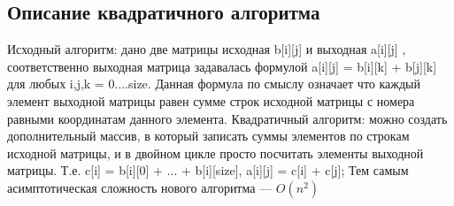 \documentclass[a4peper, 12pt, titlepage, finall]{extreport}
\begin{document}
        \subsection{Описание квадратичного алгоритма}
        Исходный алгоритм: дано две матрицы исходная {\ttfamily b[i][j]} и выходная {\ttfamily a[i][j]} , соответственно
        выходная матрица задавалась формулой {\ttfamily a[i][j] = b[i][k] + b[j][k]} для любых {\ttfamily i,j,k = 0....size.}
        Данная формула по смыслу означает что каждый элемент выходной матрицы равен сумме
        строк исходной матрицы с номера равными координатам данного элемента.
        Квадратичный алгоритм: можно создать дополнительный массив, в который записать суммы
        элементов по строкам исходной матрицы, и в двойном цикле просто посчитать элементы
        выходной матрицы. Т.е. {\ttfamily c[i] = b[i][0] + ... + b[i][size], a[i][j] = c[i] + c[j];} Тем самым
        асимптотическая сложность нового алгоритма — {\ttfamily $O(n^{2})$ }
\end{document}
